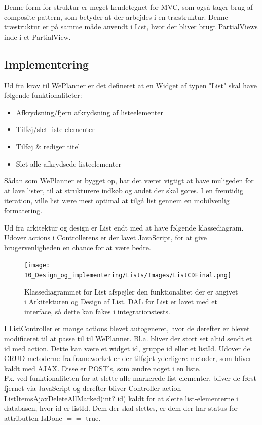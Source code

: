 \noindent Denne form for struktur er meget kendetegnet for MVC, som også tager brug af composite pattern, som betyder at der arbejdes i en træstruktur. Denne træstruktur er på samme måde anvendt i List, hvor der bliver brugt PartialViews inde i et PartialView.

\subsection{Implementering}

Ud fra krav til WePlanner er det defineret at en Widget af typen "List" skal have følgende funktionaliteter:

\begin{itemize}
    \item Afkrydsning/fjern afkrydsning af listeelementer
    \item Tilføj/slet liste elementer
    \item Tilføj \& rediger titel
    \item Slet alle afkrydsede listeelementer
\end{itemize}

Sådan som WePlanner er bygget op, har det været vigtigt at have muligeden for at lave lister, til at strukturere indkøb og andet der skal gøres. I en fremtidig iteration, ville list være mest optimal at tilgå list gennem en mobilvenlig formatering.

Ud fra arkitektur og design er List endt med at have følgende klassediagram. Udover actions i Controllerens er der lavet JavaScript, for at give brugervenligheden en chance for at være bedre.

\begin{figure}[H]
    \centering
    \texttt{[image: 10\_Design\_og\_implementering/Lists/Images/ListCDFinal.png]}
    \caption{Klassediagrammet for List afspejler den funktionalitet der er angivet i Arkitekturen og Design af List. DAL for List er lavet med et interface, så dette kan fakes i integrationstests.}
    \label{fig:listCD}
\end{figure}

I ListController er mange actions blevet autogeneret, hvor de derefter er blevet modificeret til at passe til til WePlanner. Bl.a. bliver der stort set altid sendt et id med action. Dette kan være et widget id, gruppe id eller et listId. Udover de CRUD metoderne fra frameworket er der tilføjet yderligere metoder, som bliver kaldt med AJAX. Disse er POST's, som ændre noget i en liste.\\

\noindent Fx. ved funktionaliteten for at slette alle markerede list-elementer, bliver de først fjernet via JavaScript og derefter bliver Controller action ListItemsAjaxDeleteAllMarked(int? id) kaldt for at slette list-elementerne i databasen, hvor id er listId. Dem der skal slettes, er dem der har status for attributten IsDone $==$ true.